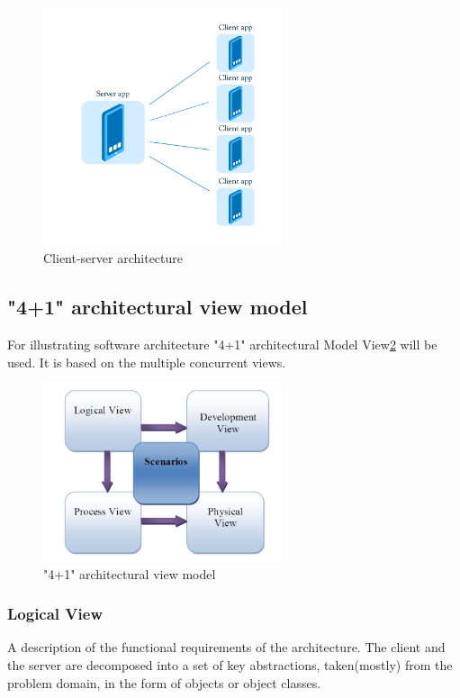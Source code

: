 \begin{figure}[H]
	\centering
		\includegraphics[width=7cm]{sprint1/arhitecture.png}
	\caption{Client-server architecture}
	\label{fig:sprint1_arhitecture}
\end{figure}

\subsection{"4+1" architectural view model}
For illustrating software architecture "4+1" architectural Model View\ref{fig:4+1 } will be used. It is based on the multiple concurrent views.

\begin{figure}[H]
	\centering
		\includegraphics[width=7cm]{sprint1/4+1.png}
	\caption{"4+1" architectural view model}
	\label{fig:4+1 }

\end{figure}

\subsubsection{Logical View}
A description of the functional requirements of the architecture. The client and the server are decomposed into a set of key abstractions, taken(mostly) from the problem domain, in the form of objects or object classes.

